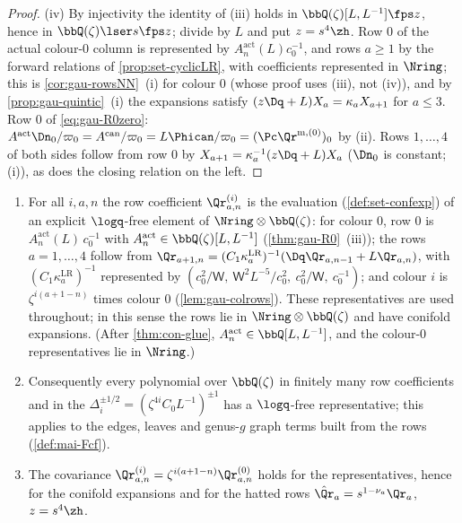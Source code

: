 \begin{proof}
(iv) By injectivity the identity of (iii) holds in $\bbQ(\zeta)[L,L^{-1}]\fps z$, hence in $\bbQ(\zeta)\lser s\fps z$; divide by $L$ and put $z=s^4\zh$. Row $0$ of the actual colour-$0$ column is represented by $A^{\mathrm{act}}_n(L)c_0^{-1}$, and rows $a\geq1$ by the forward relations of \cref{prop:set-cyclicLR}, with coefficients represented in $\Nring$; this is \cref{cor:gau-rowsNN}~(i) for colour $0$ (whose proof uses (iii), not (iv)), and by \cref{prop:gau-quintic}~(i) the expansions satisfy $(z\Dq+L)X_a=\kappa_aX_{a+1}$ for $a\leq3$. Row $0$ of \eqref{eq:gau-R0zero}: $A^{\mathrm{act}}\Dn_0/\varpi_0=A^{\mathrm{can}}/\varpi_0=L\Phican/\varpi_0=(\Pc\Qr^{\mathrm m,(0)})_0$ by (ii). Rows $1,\dots,4$ of both sides follow from row $0$ by $X_{a+1}=\kappa_a^{-1}(z\Dq+L)X_a$ ($\Dn_0$ is constant; (i)), as does the closing relation on the left.
\end{proof}

\begin{cor}
\label{cor:gau-rowsNN}
\begin{enumerate}
\item For all $i,a,n$ the row coefficient $\Qr^{(i)}_{a,n}$ is the evaluation (\cref{def:set-confexp}) of an explicit $\logq$-free element of $\Nring\otimes\bbQ(\zeta)$: for colour $0$, row $0$ is $A^{\mathrm{act}}_n(L)\,c_0^{-1}$ with $A^{\mathrm{act}}_n\in\bbQ(\zeta)[L,L^{-1}]$ (\cref{thm:gau-R0}~(iii)); the rows $a=1,\dots,4$ follow from $\Qr_{a+1,n}=(C_1\kappa^{\mathrm{LR}}_a)^{-1}(\Dq\Qr_{a,n-1}+L\Qr_{a,n})$, with $(C_1\kappa^{\mathrm{LR}}_a)^{-1}$ represented by $(c_0^2/\mathsf W,\ \mathsf W^2L^{-5}/c_0^2,\ c_0^2/\mathsf W,\ c_0^{-1})$; and colour $i$ is $\zeta^{i(a+1-n)}$ times colour $0$ (\cref{lem:gau-colrows}). These representatives are used throughout; in this sense the rows lie in $\Nring\otimes\bbQ(\zeta)$ and have conifold expansions. (After \cref{thm:con-glue}, $A^{\mathrm{act}}_n\in\bbQ[L,L^{-1}]$, and the colour-$0$ representatives lie in $\Nring$.)
\item Consequently every polynomial over $\bbQ(\zeta)$ in finitely many row coefficients and in the $\Delta_i^{\pm1/2}=(\zeta^{4i}C_0L^{-1})^{\pm1}$ has a $\logq$-free representative; this applies to the edges, leaves and genus-$g$ graph terms built from the rows (\cref{def:mai-Fcf}).
\item The covariance $\Qr^{(i)}_{a,n}=\zeta^{i(a+1-n)}\Qr^{(0)}_{a,n}$ holds for the representatives, hence for the conifold expansions and for the hatted rows $\hat{\Qr}_a=s^{1-\nu_a}\Qr_a$, $z=s^4\zh$.
\end{enumerate}
\end{cor}

